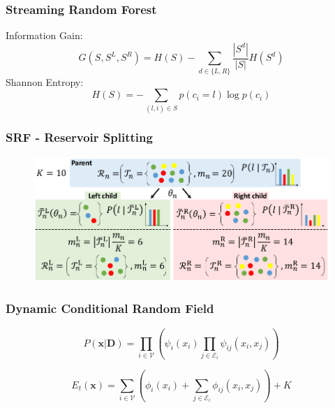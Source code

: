 \documentclass[mathserif, 10pt]{beamer}
\begin{document}
\begin{frame}
\frametitle{Streaming Random Forest}

  Information Gain:
  \begin{equation} \label{eq:infogain}
    G(S, S^L, S^R) = H(S) - \sum_{d \in \{L, R\}} \frac{|S^d|}{|S|}H(S^d)
  \end{equation}
  Shannon Entropy:
  \begin{equation}
   H(S) = - \sum_{(l, i) \in S} p(c_i = l) \log{p(c_i )}
  \end{equation}
\end{frame}

\begin{frame}
\frametitle{SRF - Reservoir Splitting}

\begin{figure}[!ht]
  \center
  \includegraphics[width=\textwidth]{figures/forest}
  \label{fig:forest}
\end{figure}

\end{frame}

\begin{frame}
\frametitle{Dynamic Conditional Random Field}

  \begin{equation} \label{eq:posterior}
  P(\mathbf{x}|\mathbf{D}) = \prod_{i \in \mathcal{V}} \left( \psi_i(x_i) \prod_{j \in \mathcal{E}_i} \psi_{ij}(x_i, x_j) \right) 
  \end{equation}

  \begin{equation} \label{eq:energy}
  E_t(\mathbf{x}) = \sum_{i \in \mathcal{V}} \left( \phi_i(x_i) + \sum_{j \in \mathcal{E}_i} \phi_{ij} (x_i, x_j) \right) + K
  \end{equation}

\end{frame}
\end{document}

